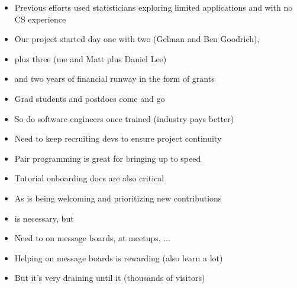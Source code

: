 \documentclass[9pt]{report}
\begin{document}
\begin{itemize}
\item Previous efforts used statisticians exploring limited
  applications and with no CS experience
\item Our project started day one with two 
  (Gelman and Ben Goodrich),
\item plus three  (me and Matt
  plus Daniel Lee)
\item and two years of financial runway in the form of grants
\end{itemize}

\begin{itemize}
\item Grad students and postdocs come and go
\item So do software engineers once trained (industry pays better)
\item Need to keep recruiting devs to ensure project continuity
\item Pair programming is great for bringing up to speed
\item Tutorial onboarding docs are also critical
\item As is being welcoming and prioritizing new contributions
\end{itemize}

\begin{itemize}
\item {} is necessary, but 
\item Need to  on message boards, at meetups, $\ldots$
\item Helping on message boards is rewarding (also learn a lot)
\item But it's very draining until it 
  (thousands of visitors)
\end{itemize}
\end{document}
